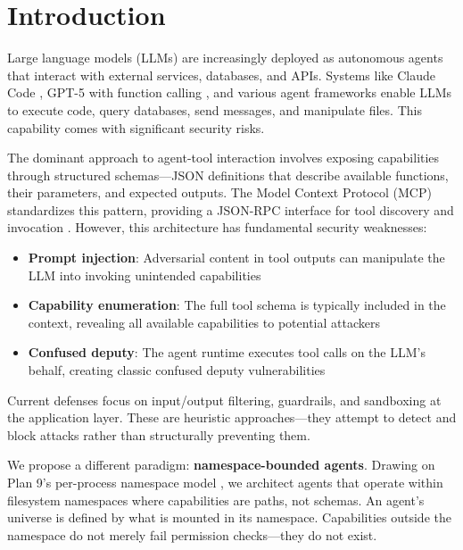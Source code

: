 \documentclass{article}
\begin{document}

\section{Introduction}
\label{sec:introduction}

Large language models (LLMs) are increasingly deployed as autonomous agents that interact with external services, databases, and APIs. Systems like Claude Code \cite{anthropic2025claudecode}, GPT-5 with function calling \cite{openai2025functioncalling}, and various agent frameworks enable LLMs to execute code, query databases, send messages, and manipulate files. This capability comes with significant security risks.

The dominant approach to agent-tool interaction involves exposing capabilities through structured schemas---JSON definitions that describe available functions, their parameters, and expected outputs. The Model Context Protocol (MCP) standardizes this pattern, providing a JSON-RPC interface for tool discovery and invocation \cite{anthropic2024mcp}. However, this architecture has fundamental security weaknesses:

\begin{itemize}
    \item \textbf{Prompt injection}: Adversarial content in tool outputs can manipulate the LLM into invoking unintended capabilities \cite{greshake2023prompt}
    \item \textbf{Capability enumeration}: The full tool schema is typically included in the context, revealing all available capabilities to potential attackers
    \item \textbf{Confused deputy}: The agent runtime executes tool calls on the LLM's behalf, creating classic confused deputy vulnerabilities
\end{itemize}

Current defenses focus on input/output filtering, guardrails, and sandboxing at the application layer. These are heuristic approaches---they attempt to detect and block attacks rather than structurally preventing them.

We propose a different paradigm: \textbf{namespace-bounded agents}. Drawing on Plan 9's per-process namespace model \cite{pike1990plan9}, we architect agents that operate within filesystem namespaces where capabilities are paths, not schemas. An agent's universe is defined by what is mounted in its namespace. Capabilities outside the namespace do not merely fail permission checks---they do not exist.
\end{document}
